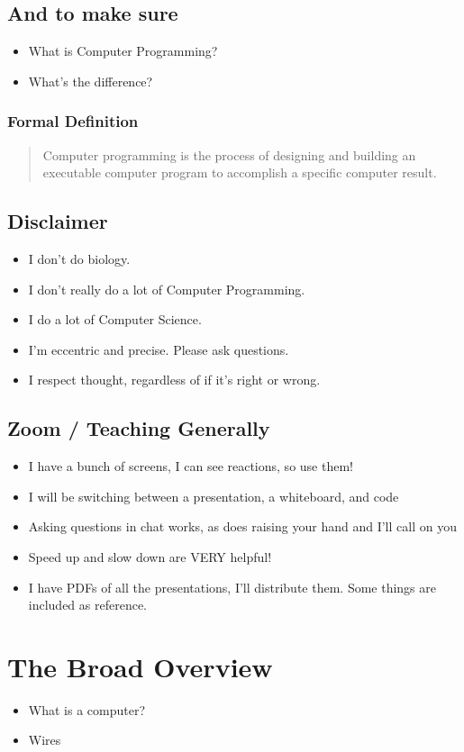 \documentclass[11pt]{article}
\begin{document}
\subsection{And to make sure}
\label{sec:org4d84a72}
\begin{itemize}
\item What is Computer Programming?
\item What's the difference?
\end{itemize}
\subsubsection{Formal Definition}
\label{sec:orgf70775f}
\begin{quote}
Computer programming is the process of designing and building an executable computer program to accomplish a specific computer result.
\end{quote}
\subsection{Disclaimer}
\label{sec:orga1a7cc4}
\begin{itemize}
\item I don't do biology.
\item I don't really do a lot of Computer Programming.
\item I do a lot of Computer Science.
\item I'm eccentric and precise.  Please ask questions.
\item I respect thought, regardless of if it's right or wrong.
\end{itemize}
\subsection{Zoom / Teaching Generally}
\label{sec:org3a9cf77}
\begin{itemize}
\item I have a bunch of screens, I can see reactions, so use them!
\item I will be switching between a presentation, a whiteboard, and code
\item Asking questions in chat works, as does raising your hand and I'll call on you
\item Speed up and slow down are VERY helpful!
\item I have PDFs of all the presentations, I'll distribute them.  Some things are included as reference.
\end{itemize}
\section{The Broad Overview}
\label{sec:orgc26f099}
\begin{itemize}
\item What is a computer?
\item Wires
\end{itemize}
\end{document}
